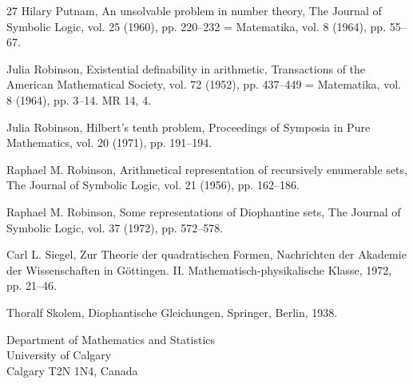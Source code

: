 \documentclass[11pt,a4paper]{article}
\newcommand{\origpage}[1]{\marginnote{\footnotesize\textbf{[#1]}}}
\begin{document}
\begin{thebibliography}{27}
 Hilary Putnam, An unsolvable problem in number theory, The Journal of Symbolic Logic, vol. 25 (1960), pp. 220--232 = Matematika, vol. 8 (1964), pp. 55--67.

 Julia Robinson, Existential definability in arithmetic, Transactions of the American Mathematical Society, vol. 72 (1952), pp. 437--449 = Matematika, vol. 8 (1964), pp. 3--14. MR 14, 4.

 Julia Robinson, Hilbert's tenth problem, Proceedings of Symposia in Pure Mathematics, vol. 20 (1971), pp. 191--194.

 Raphael M. Robinson, Arithmetical representation of recursively enumerable sets, The Journal of Symbolic Logic, vol. 21 (1956), pp. 162--186.

 Raphael M. Robinson, \origpage{351}Some representations of Diophantine sets, The Journal of Symbolic Logic, vol. 37 (1972), pp. 572--578.

 Carl L. Siegel, Zur Theorie der quadratischen Formen, Nachrichten der Akademie der Wissenschaften in Göttingen. II. Mathematisch-physikalische Klasse, 1972, pp. 21--46.

 Thoralf Skolem, Diophantische Gleichungen, Springer, Berlin, 1938.

\end{thebibliography}

\begin{flushleft}\small Department of Mathematics and Statistics\\University of Calgary\\Calgary T2N 1N4, Canada\end{flushleft}
\end{document}
